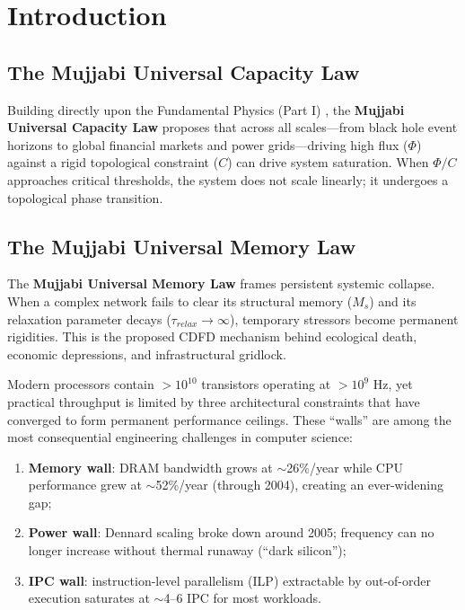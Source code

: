 \documentclass[11pt]{article}
\begin{document}
\section{Introduction}


\subsection{The Mujjabi Universal Capacity Law}
Building directly upon the Fundamental Physics (Part I) \cite{MujjabiPartI2026}, the \textbf{Mujjabi Universal Capacity Law} proposes that across all scales---from black hole event horizons to global financial markets and power grids---driving high flux ($\Phi$) against a rigid topological constraint ($C$) can drive system saturation. When $\Phi/C$ approaches critical thresholds, the system does not scale linearly; it undergoes a topological phase transition.

\subsection{The Mujjabi Universal Memory Law}
The \textbf{Mujjabi Universal Memory Law} frames persistent systemic collapse. When a complex network fails to clear its structural memory ($M_s$) and its relaxation parameter decays ($\tau_{relax} \to \infty$), temporary stressors become permanent rigidities. This is the proposed CDFD mechanism behind ecological death, economic depressions, and infrastructural gridlock.


Modern processors contain $>10^{10}$ transistors operating at $>10^9$ Hz, yet practical
throughput is limited by three architectural constraints that have converged to form permanent
performance ceilings. These ``walls'' are among the most consequential engineering challenges
in computer science:
\begin{enumerate}
    \item \textbf{Memory wall}: DRAM bandwidth grows at $\sim$26\%/year while CPU performance
          grew at $\sim$52\%/year (through 2004), creating an ever-widening gap;
    \item \textbf{Power wall}: Dennard scaling broke down around 2005; frequency can no longer
          increase without thermal runaway (``dark silicon'');
    \item \textbf{IPC wall}: instruction-level parallelism (ILP) extractable by out-of-order
          execution saturates at $\sim$4--6 IPC for most workloads.
\end{enumerate}
\end{document}
